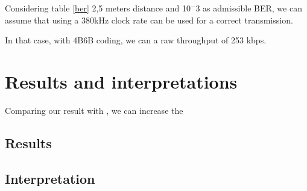 Considering table \ref{ber} 2,5 meters distance and 10$^-3$ as admissible BER, we can assume that using a 380kHz clock rate can be used for a correct transmission. 

In that case, with 4B6B coding, we can a raw throughput of 253 kbps. 

\section{Results and interpretations}

Comparing our result with \citep{phycomp}, we can increase the 
\subsection{Results}
\subsection{Interpretation}